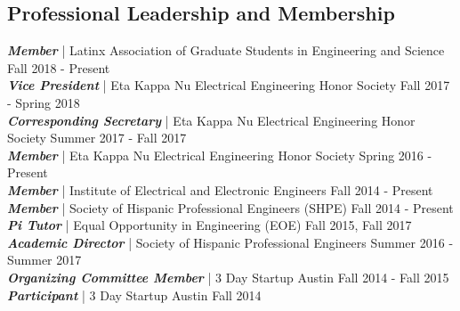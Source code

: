 \documentclass[letter]{res}
\begin{document}
\begin{resume}
\section{Professional Leadership and Membership}
{\sl \textbf{Member}} | Latinx Association of Graduate Students in Engineering and Science \hfill Fall 2018 - Present\\
{\sl \textbf{Vice President}} | Eta Kappa Nu Electrical Engineering Honor Society \hfill Fall 2017 - Spring 2018\\
{\sl \textbf{Corresponding Secretary}} | Eta Kappa Nu Electrical Engineering Honor Society \hfill Summer 2017 - Fall 2017\\
{\sl \textbf{Member}} | Eta Kappa Nu Electrical Engineering Honor Society \hfill Spring 2016 - Present\\
{\sl \textbf{Member}} | Institute of Electrical and Electronic Engineers \hfill Fall 2014 - Present\\
{\sl \textbf{Member}} | Society of Hispanic Professional Engineers (SHPE) \hfill Fall 2014 - Present\\
{\sl \textbf{Pi Tutor}} | Equal Opportunity in Engineering (EOE) \hfill Fall 2015, Fall 2017\\
{\sl \textbf{Academic Director}} | Society of Hispanic Professional Engineers \hfill Summer 2016 - Summer 2017\\
{\sl \textbf{Organizing Committee Member}} | 3 Day Startup Austin \hfill Fall 2014 - Fall 2015\\
{\sl \textbf{Participant}} | 3 Day Startup Austin \hfill Fall 2014\\

\vspace{-6mm}


\end{resume}
\end{document}

